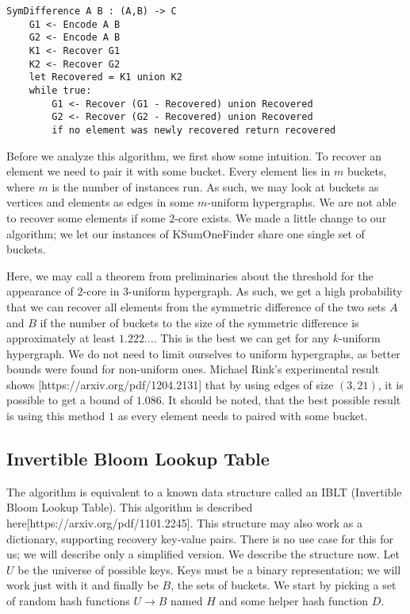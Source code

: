 \begin{lstlisting}
SymDifference A B : (A,B) -> C
    G1 <- Encode A B
    G2 <- Encode A B
    K1 <- Recover G1
    K2 <- Recover G2
    let Recovered = K1 union K2
    while true:
        G1 <- Recover (G1 - Recovered) union Recovered
        G2 <- Recover (G2 - Recovered) union Recovered
        if no element was newly recovered return recovered
\end{lstlisting}

Before we analyze this algorithm, we first show some intuition. To recover an element we need to pair it with some bucket. Every element lies in $m$ buckets, where $m$ is the number of instances run. As such, we may look at buckets as vertices and elements as edges in some $m$-uniform hypergraphs. We are not able to recover some elements if some $2$-core exists. We made a little change to our algorithm; we let our instances of KSumOneFinder share one single set of buckets.

Here, we may call a theorem from preliminaries about the threshold for the appearance of $2$-core in $3$-uniform hypergraph. As such, we get a high probability that we can recover all elements from the symmetric difference of the two sets $A$ and $B$ if the number of buckets to the size of the symmetric difference is approximately at least $1.222\dots$. This is the best we can get for any $k$-uniform hypergraph. We do not need to limit ourselves to uniform hypergraphs, as better bounds were found for non-uniform ones. Michael Rink's experimental result shows [https://arxiv.org/pdf/1204.2131] that by using edges of size $(3, 21)$, it is possible to get a bound of $1.086$.
It should be noted, that the best possible result is using this method $1$ as every element needs to paired with some bucket.

\subsection{Invertible Bloom Lookup Table}
The algorithm is equivalent to a known data structure called an IBLT (Invertible Bloom Lookup Table). This algorithm is described here[https://arxiv.org/pdf/1101.2245]. This structure may also work as a dictionary, supporting recovery key-value pairs. There is no use case for this for us; we will describe only a simplified version. We describe the structure now. Let $U$ be the universe of possible keys. Keys must be a binary representation; we will work just with it and finally be $B$, the sets of buckets. We start by picking a set of random hash functions $U \rightarrow B$ named $H$ and some helper hash function $D$.

